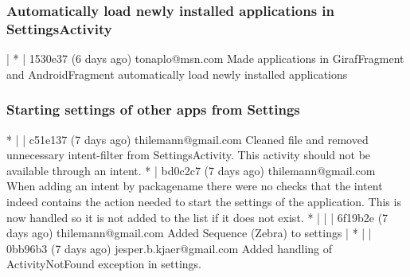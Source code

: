 \subsubsection{Automatically load newly installed applications in SettingsActivity}
| * | 1530e37 (6 days ago) tonaplo@msn.com Made applications in GirafFragment and AndroidFragment automatically load newly installed applications

\subsubsection{Starting settings of other apps from Settings}
* | | c51e137 (7 days ago) thilemann@gmail.com Cleaned file and removed unnecessary intent-filter from SettingsActivity. This activity should not be available through an intent.
* | bd0c2c7 (7 days ago) thilemann@gmail.com When adding an intent by packagename there were no checks that the intent indeed contains the action needed to start the settings of the application. This is now
handled so it is not added to the list if it does not exist.
* | | | 6f19b2e (7 days ago) thilemann@gmail.com Added Sequence (Zebra) to settings
| * | | 0bb96b3 (7 days ago) jesper.b.kjaer@gmail.com Added handling of ActivityNotFound exception in settings.